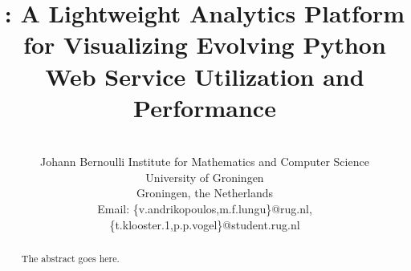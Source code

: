 \documentclass[conference]{IEEEtran}
\begin{document}
%
\title{\tool: A Lightweight Analytics Platform for Visualizing Evolving Python Web Service Utilization and Performance}



\author{
\\
Johann Bernoulli Institute for Mathematics and Computer Science\\
University of Groningen\\
Groningen, the Netherlands\\
Email: \{v.andrikopoulos,m.f.lungu\}@rug.nl, \{t.klooster.1,p.p.vogel\}@student.rug.nl
}

\maketitle

\begin{abstract}
The abstract goes here.
\end{abstract}


\IEEEpeerreviewmaketitle
\end{document}
